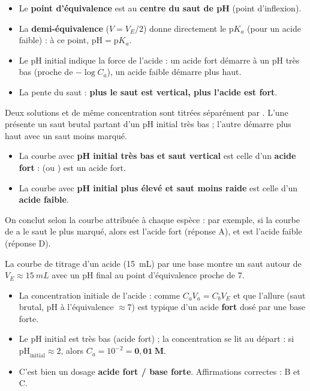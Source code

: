 \documentclass[11pt,a4paper]{article}
\begin{document}
\begin{regle}
\begin{itemize}[leftmargin=1.6em,topsep=2pt,itemsep=2pt]
  \item Le \textbf{point d'équivalence} est au \textbf{centre du saut de pH} (point d'inflexion).
  \item La \textbf{demi-équivalence} ($V = V_E/2$) donne directement le $\mathrm{p}K_a$ (pour un acide faible) :
        à ce point, $\mathrm{pH} = \mathrm{p}K_a$.
  \item Le pH initial indique la force de l'acide : un acide fort démarre à un pH très bas (proche de
        $-\log C_a$), un acide faible démarre plus haut.
  \item La pente du saut : \textbf{plus le saut est vertical, plus l'acide est fort}.
\end{itemize}
\end{regle}

\begin{exemple}
Deux solutions  et  de même concentration sont titrées séparément par . L'une présente
un saut brutal partant d'un pH initial très bas ; l'autre démarre plus haut avec un saut moins marqué.
\begin{itemize}[leftmargin=1.6em,topsep=2pt,itemsep=2pt]
  \item La courbe avec \textbf{pH initial très bas et saut vertical} est celle d'un \textbf{acide fort} :
         (ou ) est un acide fort.
  \item La courbe avec \textbf{pH initial plus élevé et saut moins raide} est celle d'un \textbf{acide faible}.
\end{itemize}
On conclut selon la courbe attribuée à chaque espèce : par exemple, si la courbe de  a le saut le plus
marqué, alors  est l'acide fort (réponse A), et  est l'acide faible (réponse D).
\end{exemple}

\begin{exemple}
La courbe de titrage d'un acide (\SI{15}{mL}) par une base montre un saut autour de $V_E \approx \SI{15}{mL}$
avec un pH final au point d'équivalence proche de 7.
\begin{itemize}[leftmargin=1.6em,topsep=2pt,itemsep=2pt]
  \item La concentration initiale de l'acide : comme $C_a V_a = C_b V_E$ et que l'allure (saut brutal, pH à
        l'équivalence $\approx 7$) est typique d'un acide \textbf{fort} dosé par une base forte.
  \item Le pH initial est très bas (acide fort) ; la concentration se lit au départ : si
        $\mathrm{pH}_{\text{initial}} \approx 2$, alors $C_a = 10^{-2} = \mathbf{0{,}01\ M}$.
  \item C'est bien un dosage \textbf{acide fort / base forte}. Affirmations correctes : B et C.
\end{itemize}
\end{exemple}
\end{document}
